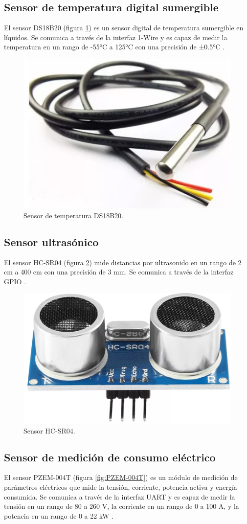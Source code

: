 \subsection{Sensor de temperatura digital sumergible}

El sensor DS18B20 (figura \ref{fig:DS18B20}) es un sensor digital de
temperatura sumergible en líquidos. Se comunica a través de la interfaz 1-Wire
y es capaz de medir la temperatura en un rango de -55°C a 125°C con una
precisión de ±0.5°C \cite{DS18B20}.

\begin{figure}[H]
	\centering
	\includegraphics[width=.20\textwidth]{./Images/10.png}
	\caption{Sensor de temperatura DS18B20.}
	\label{fig:DS18B20}
\end{figure}

\subsection{Sensor ultrasónico}

El sensor HC-SR04 (figura \ref{fig:HC-SR04}) mide distancias por ultrasonido en
un rango de 2 cm a 400 cm con una precisión de 3 mm. Se comunica a través de la
interfaz GPIO \cite{HC-SR04}.

\begin{figure}[H]
	\centering
	\includegraphics[width=.20\textwidth]{./Images/11.png}
	\caption{Sensor HC-SR04.}
	\label{fig:HC-SR04}
\end{figure}

\subsection{Sensor de medición de consumo eléctrico}

El sensor PZEM-004T (figura \ref{fig:PZEM-004T}) es un módulo de medición de
parámetros eléctricos que mide la tensión, corriente, potencia activa y energía
consumida. Se comunica a través de la interfaz UART y es capaz de medir la
tensión en un rango de 80 a 260 V, la corriente en un rango de 0 a 100 A, y la
potencia en un rango de 0 a 22 kW \cite{PZEM-004T}.

